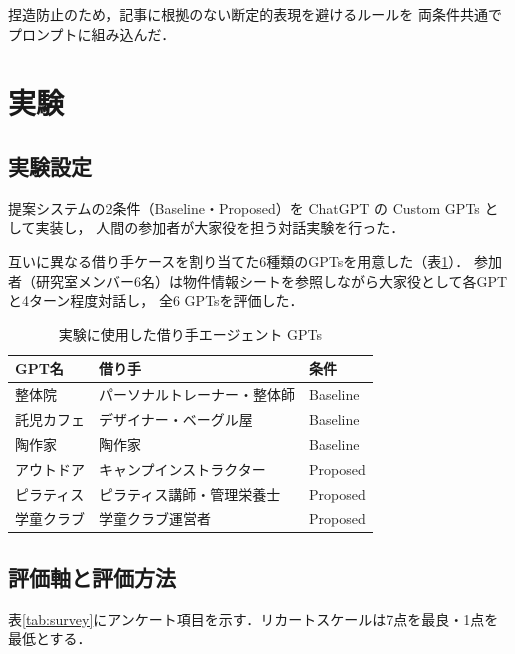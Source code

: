 \documentclass[dvipdfmx]{FITpaper}
\begin{document}
捏造防止のため，記事に根拠のない断定的表現を避けるルールを
両条件共通でプロンプトに組み込んだ．
\\

\section{実験}

\subsection{実験設定}

提案システムの2条件（Baseline・Proposed）を ChatGPT の Custom GPTs として実装し，
人間の参加者が大家役を担う対話実験を行った．

互いに異なる借り手ケースを割り当てた6種類のGPTsを用意した（表\ref{tab:gpts}）．
参加者（研究室メンバー6名）は物件情報シートを参照しながら大家役として各GPTと4ターン程度対話し，
全6 GPTsを評価した．

\begin{table}[t]
  \centering
  \caption{実験に使用した借り手エージェント GPTs}
  \label{tab:gpts}
  \small
  \begin{tabular}{llp{1.55cm}}
    \toprule
    GPT名 & 借り手 & 条件 \\
    \midrule
    整体院 & パーソナルトレーナー・整体師 & Baseline \\
    託児カフェ & デザイナー・ベーグル屋 & Baseline \\
    陶作家 & 陶作家 & Baseline \\
    アウトドア & キャンプインストラクター & Proposed \\
    ピラティス & ピラティス講師・管理栄養士 & Proposed \\
    学童クラブ & 学童クラブ運営者 & Proposed \\
    \bottomrule
  \end{tabular}
\end{table}

\subsection{評価軸と評価方法}

表\ref{tab:survey}にアンケート項目を示す．リカートスケールは7点を最良・1点を最低とする．\\
\end{document}
